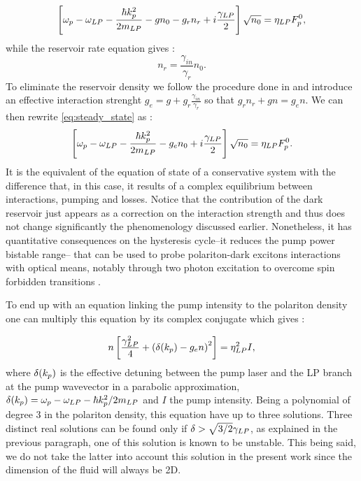 \begin{equation}
    \left[\omega_p -\omega_{LP} - \dfrac{\hbar k_p^2}{2 m_{LP}} - g n_0 - g_rn_r + i \dfrac{\gamma_{LP}}{2} \right] \sqrt{n_0}= \eta_{LP} F_p^0,
    \label{eq:steady_state}
\end{equation}
while the reservoir rate equation gives :
\begin{equation}
    n_r = \dfrac{\gamma_{in}}{\gamma_r}n_0.
\end{equation}
To eliminate the reservoir density we follow the procedure done in \cite{stepanov_dispersion_2019} and introduce an effective interaction strenght $g_{e}=g+g_r\frac{\gamma_{in}}{\gamma_r}$ so that $g_rn_r+gn=g_{e}n$. 
We can then rewrite \autoref{eq:steady_state} as :
\begin{equation}
    \left[\omega_p -\omega_{LP} - \dfrac{\hbar k_p^2}{2 m_{LP}} - g_{e}n_0 + i \dfrac{\gamma_{LP}}{2} \right] \sqrt{n_0}= \eta_{LP} F_p^0.
    \label{eq:steady_state_2}
\end{equation}
It is the equivalent of the equation of state of a conservative system with the difference that, in this case, it results of a complex equilibrium between interactions, pumping and losses. Notice that 
the contribution of the dark reservoir just appears as a correction on the interaction strength and thus does not change significantly the phenomenology discussed earlier. Nonetheless, it 
 has quantitative consequences on the hysteresis cycle--it reduces the pump power bistable range-- that can be used to probe polariton-dark excitons interactions with optical means, notably through two photon excitation to overcome spin forbidden transitions \cite{dark_exciton_pol_interactions}.

\bigskip

To end up with an equation linking the pump intensity to the polariton density one can multiply this equation by its complex conjugate which gives :

\begin{equation}
    n \left[ \dfrac{\gamma_{LP}^2}{4} + \left(\delta(k_p) - g_{e} n \right)^2 \right] =  \eta_{LP}^2 I,
\label{eq:eq_of_state}
\end{equation}
where $\delta(k_p)$ is the effective detuning between the pump laser and the LP branch at the pump wavevector in a parabolic approximation, $\delta(k_p) = \omega_p - \omega_{LP}-{\hbar k_p^2}/2m_{LP}$ and $I$ the pump intensity. Being a polynomial of degree 3 in the polariton density, this equation have up to three solutions.
Three distinct real solutions can be found only if $\delta>\sqrt{3/2}\gamma_{LP}$, as explained in the previous paragraph, one of this solution is known to be unstable.
This being said, we do not take the latter into account this solution in the present work since the dimension of the fluid will always be 2D.

